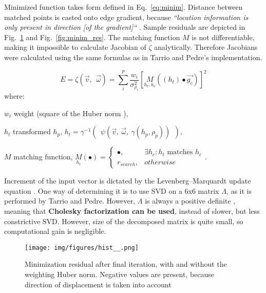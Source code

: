Minimized function takes form defined in Eq.~\ref{eq:minim}. Distance between matched points is casted onto edge gradient, because \textit{``location information is only present in direction [of the gradient]``}  \cite{jose2015realtime}. Sample residuals are depicted in Fig.~\ref{fig:minim_hist} and Fig.~\ref{fig:minim_res}. The matching function $M$ is not differentiable, making it impossible to calculate Jacobian of $\zeta$ analytically. Therefore Jacobians were calculated using the same formulas as in Tarrio and Pedre's implementation.

\begin{equation}
E = \zeta \left( \vec{v},\ \ \vec{\omega} \right) = \sum_{i}^{p} \frac{w_i}{\sigma_{\rho_{i}}^2} \left[ \underset{h_t, h_c}{M} \left( \left( h_t \right) \bullet \vec{g_c} \right) \right] ^2
\label{eq:minim}
\end{equation}
where:
\begin{eqwhere}[2cm]
	\item[$w_i$] weight (square of the Huber norm \cite{huber1964robust}),
	\item[$h_t$] transformed $h_p$, $h_{t} = \gamma^{-1}\left(\ \  \psi \left( \vec{v},\ \vec{\omega},\ \gamma \left( h_p, \rho_{p} \right) \right)\ \  \right)$,
	\item[$M$] matching function, $\underset{h_t}{M}(\bullet) = \begin{cases} 
	\bullet, & \exists h_c : h_t \textrm{ matches } h_c \\
	r_{search}, & otherwise
	\end{cases}$.
\end{eqwhere}


Increment of the input vector is dictated by the Levenberg–Marquardt update equation \cite{press2007numerical}. One way of determining it is to use SVD on a 6x6 matrix $\Lambda$, as it is performed by Tarrio and Pedre. However, $\Lambda$ is always a positive definite \cite{madsen2004methods}, meaning that \textbf{Cholesky factorization can be used}, instead of slower, but less constrictive SVD. However, size of the decomposed matrix is quite small, so computational gain is negligible.

\begin{figure}[ht]
	\centering\texttt{[image: img/figures/hist\_\_.png]}
	\caption{ Minimization residual after final iteration, with and without the weighting Huber norm. Negative values are present, because direction of displacement is taken into account }
	\label{fig:minim_hist}
\end{figure}


